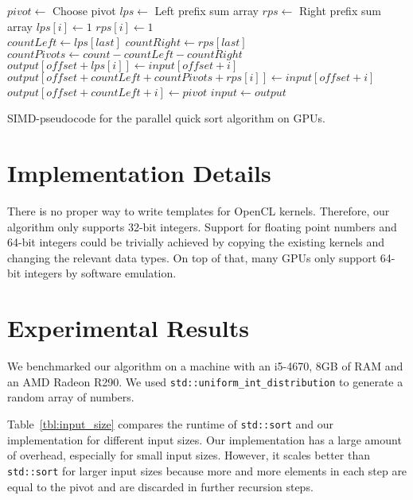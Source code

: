 \documentclass{llncs}
\begin{document}
\begin{algorithm}
\begin{algorithmic}
\State $pivot \gets$ Choose pivot
\State $lps \gets$ Left prefix sum array
\State $rps \gets$ Right prefix sum array
  \State $lps[i] \gets 1$
  \State $rps[i] \gets 1$
\EndIf\\
\State {}
\State {}
\State $countLeft \gets lps[last]$
\State $countRight \gets rps[last]$
\State $countPivots \gets count - countLeft - countRight$\\
  \State $output[offset + lps[i]] \gets input[offset + i]$
  \State $output[offset + countLeft + countPivots + rps[i]] \gets input[offset + i]$
\EndIf
{}
  \State $output[offset + countLeft +i] \gets pivot$
\EndIf
\State $input \gets output$
\State {}
\State {}
\EndFunction
\end{algorithmic}
\label{alg1}
\caption{SIMD-pseudocode for the parallel quick sort algorithm on GPUs.}
\end{algorithm}

\section{Implementation Details}
There is no proper way to write templates for OpenCL kernels. Therefore, our algorithm only supports 32-bit integers. Support for floating point numbers and 64-bit integers could be trivially achieved by copying the existing kernels and changing the relevant data types. On top of that, many GPUs only support 64-bit integers by software emulation.

\section{Experimental Results}

We benchmarked our algorithm on a machine with an i5-4670, 8GB of RAM and an AMD Radeon R290. We used \texttt{std::uniform\_int\_distribution} to generate a random array of numbers.

Table~\ref{tbl:input_size} compares the runtime of \texttt{std::sort} and our implementation for different input sizes. Our implementation has a large amount of overhead, especially for small input sizes. However, it scales better than \texttt{std::sort} for larger input sizes because more and more elements in each step are equal to the pivot and are discarded in further recursion steps.
\end{document}
